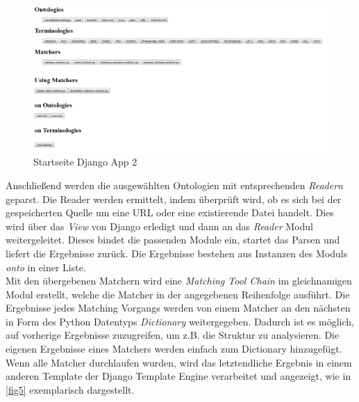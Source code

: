 		\begin{figure}[ht]
		\centering
		\includegraphics[width=1.0\textwidth]{pics/TemplateMatchingStartPage1.png}
		\caption{Startseite Django App 2}
		\label{fig4}
		\end{figure}
		Anschließend werden die ausgewählten Ontologien mit entsprechenden
		\textit{Readern} geparst. Die Reader werden ermittelt, indem überprüft wird,
		ob es sich bei der gespeicherten Quelle um eine URL oder eine
		existierende Datei handelt. Dies wird über das \textit{View} von Django
		erledigt und dann an das \textit{Reader} Modul weitergeleitet. Dieses bindet
		die passenden Module ein, startet das Parsen und liefert die Ergebnisse
		zurück. Die Ergebnisse bestehen aus Instanzen des Moduls \textit{onto} in
		einer Liste.\\
		Mit den übergebenen Matchern wird eine \textit{Matching Tool Chain} im
		gleichnamigen Modul erstellt, welche die Matcher in der angegebenen
		Reihenfolge ausführt. Die Ergebnisse jedes Matching Vorgangs werden von einem
		Matcher an den nächsten in Form des Python Datentyps \textit{Dictionary}
		weitergegeben. Dadurch ist es möglich, auf vorherige Ergebnisse zuzugreifen,
		um z.B. die Struktur zu analysieren. Die eigenen Ergebnisse eines Matchers
		werden einfach zum Dictionary hinzugefügt.\\
		Wenn alle Matcher durchlaufen wurden, wird das letztendliche Ergebnis in einem
		anderen Template der Django Template Engine verarbeitet und angezeigt,
		wie in \ref{fig5} exemplarisch dargestellt.
				
